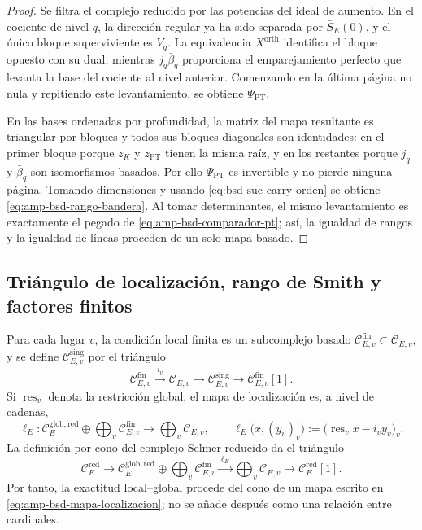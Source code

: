\begin{proof}
Se filtra el complejo reducido por las potencias del ideal de aumento. En el
cociente de nivel \(q\), la dirección regular ya ha sido separada por
\(\bar S_E(0)\), y el único bloque superviviente es \(V_q\). La equivalencia
\(X^{\mathrm{orth}}\) identifica el bloque opuesto con su dual, mientras
\(j_q\bar\beta_q\) proporciona el emparejamiento perfecto que levanta la
base del cociente al nivel anterior. Comenzando en la última página no nula y
repitiendo este levantamiento, se obtiene \(\Psi_{\mathrm{PT}}\).

En las bases ordenadas por profundidad, la matriz del mapa resultante es
triangular por bloques y todos sus bloques diagonales son identidades: en el
primer bloque porque \(z_K\) y \(z_{\mathrm{PT}}\) tienen la misma raíz, y
en los restantes porque \(j_q\) y \(\bar\beta_q\) son isomorfismos basados.
Por ello \(\Psi_{\mathrm{PT}}\) es invertible y no pierde ninguna página.
Tomando dimensiones y usando
\eqref{eq:bsd-suc-carry-orden} se obtiene
\eqref{eq:amp-bsd-rango-bandera}. Al tomar determinantes, el mismo
levantamiento es exactamente el pegado de
\eqref{eq:amp-bsd-comparador-pt}; así, la igualdad de rangos y la igualdad de
líneas proceden de un solo mapa basado.
\end{proof}

\subsection{Triángulo de localización, rango de Smith y factores finitos}
\label{subsec:amp-bsd-smith-sha}

Para cada lugar \(v\), la condición local finita es un subcomplejo basado
\(\mathcal C_{E,v}^{\mathrm{fin}}\subset\mathcal C_{E,v}\), y se define
\(\mathcal C_{E,v}^{\mathrm{sing}}\) por el triángulo
\begin{equation}\label{eq:amp-bsd-triangulo-local}
 \mathcal C_{E,v}^{\mathrm{fin}}
 \xrightarrow{\ i_v\ }\mathcal C_{E,v}
 \longrightarrow\mathcal C_{E,v}^{\mathrm{sing}}
 \longrightarrow\mathcal C_{E,v}^{\mathrm{fin}}[1].
\end{equation}
Si \(\operatorname{res}_v\) denota la restricción global, el mapa de
localización es, a nivel de cadenas,
\begin{equation}\label{eq:amp-bsd-mapa-localizacion}
 \ell_E:
 \mathcal C_E^{\mathrm{glob,red}}\oplus
 \bigoplus_v\mathcal C_{E,v}^{\mathrm{fin}}
 \longrightarrow\bigoplus_v\mathcal C_{E,v},
 \qquad
 \ell_E\bigl(x,(y_v)_v\bigr)
 :=\bigl(\operatorname{res}_v x-i_vy_v\bigr)_v .
\end{equation}
La definición por cono del complejo Selmer reducido da el triángulo
\begin{equation}\label{eq:amp-bsd-triangulo-localizacion}
 \mathcal C_E^{\mathrm{red}}
 \longrightarrow
 \mathcal C_E^{\mathrm{glob,red}}\oplus
 \bigoplus_v\mathcal C_{E,v}^{\mathrm{fin}}
 \xrightarrow{\ \ell_E\ }
 \bigoplus_v\mathcal C_{E,v}
 \longrightarrow\mathcal C_E^{\mathrm{red}}[1].
\end{equation}
Por tanto, la exactitud local--global procede del cono de un mapa escrito en
\eqref{eq:amp-bsd-mapa-localizacion}; no se añade después como una relación
entre cardinales.

